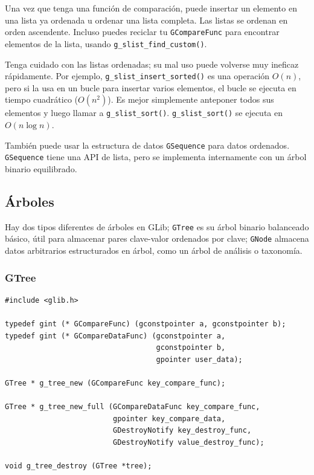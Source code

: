 Una vez que tenga una función de comparación, puede insertar un elemento en una lista ya ordenada u ordenar una lista completa. Las listas se ordenan en orden ascendente. Incluso puedes reciclar tu \lstinline{GCompareFunc} para encontrar elementos de la lista, usando \lstinline{g_slist_find_custom()}.

Tenga cuidado con las listas ordenadas; su mal uso puede volverse muy ineficaz rápidamente. Por ejemplo, \lstinline{g_slist_insert_sorted()} es una operación $O(n)$, pero si la usa en un bucle para insertar varios elementos, el bucle se ejecuta en tiempo cuadrático ($O(n^2)$). Es mejor simplemente anteponer todos sus elementos y luego llamar a \lstinline{g_slist_sort()}. \lstinline{g_slist_sort()} se ejecuta en $O(n \log n)$.

También puede usar la estructura de datos \lstinline{GSequence} para datos ordenados. \lstinline{GSequence} tiene una API de lista, pero se implementa internamente con un árbol binario equilibrado.

\subsection{Árboles}

Hay dos tipos diferentes de árboles en GLib; \lstinline{GTree} es su árbol binario balanceado básico, útil para almacenar pares clave-valor ordenados por clave; \lstinline{GNode} almacena datos arbitrarios estructurados en árbol, como un árbol de análisis o taxonomía.

\subsubsection{GTree}

\begin{lstlisting}[style=GLib/GTK, caption={Creando y destruyendo árboles binarios balanceados}, label=glib-treeconstruct]
#include <glib.h>

typedef gint (* GCompareFunc) (gconstpointer a, gconstpointer b);
typedef gint (* GCompareDataFunc) (gconstpointer a,
                                   gconstpointer b,
                                   gpointer user_data);

GTree * g_tree_new (GCompareFunc key_compare_func);

GTree * g_tree_new_full (GCompareDataFunc key_compare_func,
                         gpointer key_compare_data,
                         GDestroyNotify key_destroy_func,
                         GDestroyNotify value_destroy_func);

void g_tree_destroy (GTree *tree);
\end{lstlisting}

